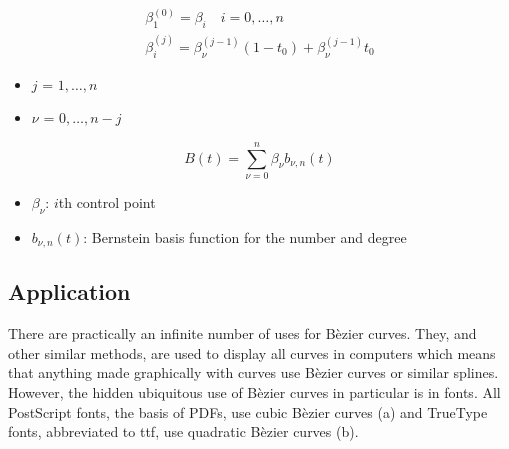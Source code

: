 \documentclass[12pt, letterpaper]{article}
\begin{document}
\begin{singlespace}
  \begin{gather}
    \label{eq:DCRec}
    \beta_{1}^{(0)} = \beta_i \quad i = 0,\ldots, n \\
    \beta_{i}^{(j)} = \beta_{\nu}^{(j-1)} (1 - t_0) + \beta_{\nu}^{(j-1)} t_0
  \end{gather}
  \begin{small}
    \begin{itemize}[label=]
      \item $j$ = $1,\ldots,n$
      \item $\nu$ = $0,\ldots,n-j$
    \end{itemize}
  \end{small}
  \begin{equation}
    \label{eq:DCExplicit}
    B(t) = \sum_{\nu=0}^{n} \beta_\nu b_{\nu,n}(t)
  \end{equation}
  \begin{small}
    \begin{itemize}[label=]
      \item $\beta_\nu$: $i$th control point
      \item $b_{\nu,n}(t)$: Bernstein basis function for the number and degree
    \end{itemize}
  \end{small}
\end{singlespace}

\subsection{Application}
There are practically an infinite number of uses for B\`ezier curves. They, and other similar methods, are 
used
to display all curves in computers which means that anything made graphically with curves use B\`ezier curves
or similar splines. However, the hidden ubiquitous use of B\`ezier curves in particular is in 
fonts. All PostScript fonts, the basis of PDFs, use cubic B\`ezier curves (a) and TrueType fonts,
abbreviated to ttf, use quadratic B\`ezier curves (b).
\end{document}

